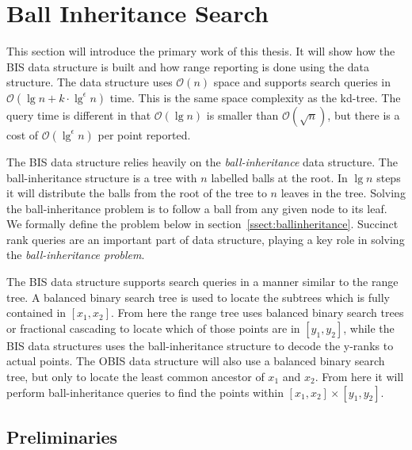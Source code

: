 \section{Ball Inheritance Search}
\label{sect:simple}

This section will introduce the primary work of this thesis. It will show how the BIS data structure is built and how range reporting is done using the data structure. The data structure uses $\mathcal{O}(n)$ space and supports search queries in $\mathcal{O}(\lg n + k\cdot \lg^\epsilon n)$ time. This is the same space complexity as the kd-tree. The query time is different in that $\mathcal{O}(\lg n)$ is smaller than $\mathcal{O}(\sqrt{n})$, but there is a cost of $\mathcal{O}(\lg^\epsilon n)$ per point reported. 

The BIS data structure relies heavily on the \emph{ball-inheritance} data structure. The ball-inheritance structure is a tree with $n$ labelled balls at the root. In $\lg n$ steps it will distribute the balls from the root of the tree to $n$ leaves in the tree. Solving the ball-inheritance problem is to follow a ball from any given node to its leaf. We formally define the problem below in section~\ref{ssect:ballinheritance}. Succinct rank queries are an important part of data structure, playing a key role in solving the \emph{ball-inheritance problem}.

The BIS data structure supports search queries in a manner similar to the range tree. A balanced binary search tree is used to locate the subtrees which is fully contained in $[x_1, x_2]$. From here the range tree uses balanced binary search trees or fractional cascading to locate which of those points are in $[y_1, y_2]$, while the BIS data structures uses the ball-inheritance structure to decode the y-ranks to actual points. The OBIS data structure will also use a balanced binary search tree, but only to locate the least common ancestor of $x_1$ and $x_2$. From here it will perform ball-inheritance queries to find the points within $[x_1, x_2] \times [y_1, y_2]$.


\subsection{Preliminaries}

